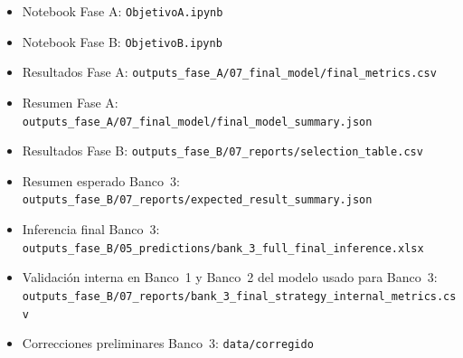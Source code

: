 \documentclass[10pt,a4paper]{article}
\begin{document}
\begin{itemize}[leftmargin=*, itemsep=0pt]
  \item Notebook Fase A: \texttt{ObjetivoA.ipynb}
  \item Notebook Fase B: \texttt{ObjetivoB.ipynb}
  \item Resultados Fase A: \nolinkurl{outputs_fase_A/07_final_model/final_metrics.csv}
  \item Resumen Fase A: \nolinkurl{outputs_fase_A/07_final_model/final_model_summary.json}
  \item Resultados Fase B: \nolinkurl{outputs_fase_B/07_reports/selection_table.csv}
  \item Resumen esperado Banco~3: \nolinkurl{outputs_fase_B/07_reports/expected_result_summary.json}
  \item Inferencia final Banco~3: \nolinkurl{outputs_fase_B/05_predictions/bank_3_full_final_inference.xlsx}
  \item Validación interna en Banco~1 y Banco~2 del modelo usado para Banco~3: \nolinkurl{outputs_fase_B/07_reports/bank_3_final_strategy_internal_metrics.csv}
  \item Correcciones preliminares Banco~3: \nolinkurl{data/corregido}
\end{itemize}
\end{document}
